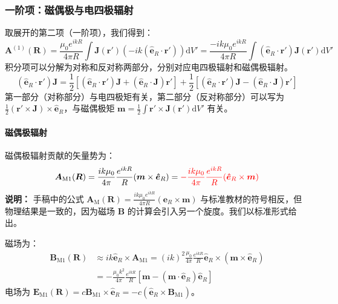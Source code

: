 \documentclass[fontset=none]{ctexart}
\begin{document}
\subsubsection{一阶项：磁偶极与电四极辐射}
取展开的第二项（一阶项），我们得到：
\begin{equation}
    \bm{A}^{(1)}(\bm{R}) = \frac{\mu_0 e^{ikR}}{4\pi R} \int \bm{J}(\bm{r}') (-ik(\bm{\hat{e}}_R \cdot \bm{r}')) \mathrm{d}V' = \frac{-ik\mu_0 e^{ikR}}{4\pi R} \int (\bm{\hat{e}}_R \cdot \bm{r}')\bm{J}(\bm{r}') \mathrm{d}V'
\end{equation}
积分项可以分解为对称和反对称两部分，分别对应电四极辐射和磁偶极辐射。
\begin{equation}
    (\bm{\hat{e}}_R \cdot \bm{r}')\bm{J} = \frac{1}{2}[(\bm{\hat{e}}_R \cdot \bm{r}')\bm{J} + (\bm{\hat{e}}_R \cdot \bm{J})\bm{r}'] + \frac{1}{2}[(\bm{\hat{e}}_R \cdot \bm{r}')\bm{J} - (\bm{\hat{e}}_R \cdot \bm{J})\bm{r}']
\end{equation}
第一部分（对称部分）与电四极矩有关，第二部分（反对称部分）可以写为 $\frac{1}{2}(\bm{r}' \times \bm{J}) \times \bm{\hat{e}}_R$，与磁偶极矩 $\bm{m} = \frac{1}{2}\int \bm{r}' \times \bm{J}(\bm{r}') \mathrm{d}V'$ 有关。

\paragraph{磁偶极辐射}
磁偶极辐射贡献的矢量势为：
\begin{equation}
    \bm{A}_{\mathrm{M1}}(\bm{R}) = \frac{ik\mu_0}{4\pi} \frac{e^{ikR}}{R} (\bm{m} \times \bm{\hat{e}}_R) = \textcolor{red}{-\frac{ik\mu_0}{4\pi} \frac{e^{ikR}}{R} (\bm{\hat{e}}_R \times \bm{m})}
\end{equation}
\textbf{说明：} 手稿中的公式 $\bm{A}_{\mathrm{M}}(\bm{R}) = \frac{ik\mu_0 e^{ikR}}{4\pi R}(\bm{e}_R \times \bm{m})$ 与标准教材的符号相反，但物理结果是一致的，因为磁场 $\bm{B}$ 的计算会引入另一个旋度。我们以标准形式给出。

磁场为：
\begin{equation}
    \begin{aligned}
        \bm{B}_{\mathrm{M1}}(\bm{R}) &\approx ik \bm{\hat{e}}_R \times \bm{A}_{\mathrm{M1}} = (ik)^2 \frac{\mu_0}{4\pi} \frac{e^{ikR}}{R} \bm{\hat{e}}_R \times (\bm{m} \times \bm{\hat{e}}_R) \\
        &= -\frac{\mu_0 k^2}{4\pi} \frac{e^{ikR}}{R} [\bm{m} - (\bm{m}\cdot\bm{\hat{e}}_R)\bm{\hat{e}}_R]
    \end{aligned}
\end{equation}
电场为 $\bm{E}_{\mathrm{M1}}(\bm{R}) = c\bm{B}_{\mathrm{M1}} \times \bm{\hat{e}}_R = -c(\bm{\hat{e}}_R \times \bm{B}_{\mathrm{M1}})$。
\end{document}
